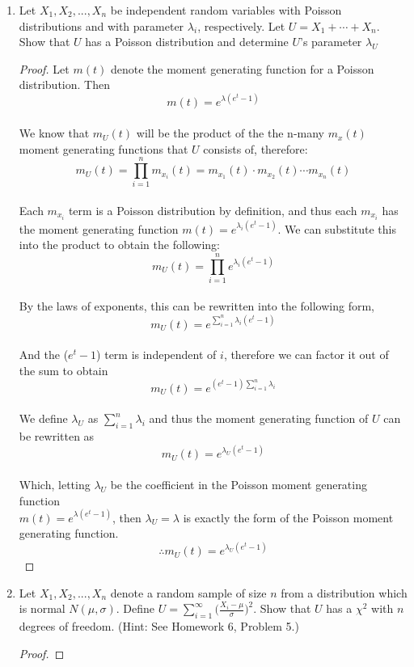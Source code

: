 \documentclass[11pt]{article}
\begin{document}
\begin{enumerate}
    \item Let \(X_1, X_2, ..., X_n\) be independent random variables with Poisson distributions and with parameter \(\lambda_i\), respectively. Let \(U = X_1 + \cdots + X_n\). Show that \(U\) has a Poisson distribution and determine \(U\)'s parameter \(\lambda_U\)
    \begin{proof}
        Let \(m(t)\) denote the moment generating function for a Poisson distribution. Then
        $$m(t) = e^{\lambda (e^t-1)}$$
        \\We know that \(m_U(t)\) will be the product of the the n-many \(m_x(t)\) moment generating functions that \(U\) consists of, therefore:
        $$m_U(t) = \prod_{i=1}^{n} m_{x_i}(t) = m_{x_1}(t) \cdot m_{x_2}(t) \cdots m_{x_n}(t)$$
        \\Each \(m_{x_i}\) term is a Poisson distribution by definition, and thus each \(m_{x_i}\) has the moment generating function \(m(t) = e^{\lambda_i (e^t-1)}\). We can substitute this into the product to obtain the following:
        $$m_U(t) = \prod_{i=1}^{n} e^{\lambda_i (e^t-1)}$$
        \\By the laws of exponents, this can be rewritten into the following form,
        $$m_U(t) = e^{\sum_{i=1}^{n}\lambda_i (e^t-1)}$$
        \\And the (\(e^t-1\)) term is independent of \(i\), therefore we can factor it out of the sum to obtain
        $$m_U(t) = e^{(e^t-1)\sum_{i=1}^{n}\lambda_i }$$
        \\We define \(\lambda_U\) as \(\sum_{i=1}^{n}\lambda_i\) and thus the moment generating function of \(U\) can be rewritten as
        $$m_U(t) = e^{\lambda_U (e^t-1)}$$
        \\Which, letting \(\lambda_U\) be the coefficient in the Poisson moment generating function \\\(m(t) = e^{\lambda (e^t-1)}\), then \(\lambda_U = \lambda\) is exactly the form of the Poisson moment generating function.
        \\$$ \boxed{\therefore m_U(t) = e^{\lambda_U (e^t-1)} }$$
    \end{proof}
    \item Let \(X_1, X_2, ..., X_n\) denote a random sample of size \(n\) from a distribution which is normal \(N(\mu, \sigma)\). Define \(U = \sum_{i=1}^{\infty} \Big(\frac{X_i - \mu }{\sigma}\Big)^2\). Show that \(U\) has a \(\chi ^2\) with \(n\) degrees of freedom. (Hint: See Homework 6, Problem 5.)
    \begin{proof}

\end{proof}
\end{enumerate}
\end{document}
